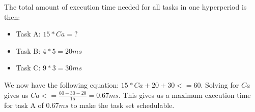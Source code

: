     The total amount of execution time needed for all tasks in one hyperperiod is then:
    \begin{itemize}
        \item Task A: $15*Ca =?$
        \item Task B: $4*5 = 20ms$
        \item Task C: $9*3 = 30ms$
    \end{itemize}

    We now have the following equation: $15*Ca + 20 + 30 <= 60$. Solving for $Ca$ gives us $Ca <= \frac{60-30-20}{15} = 0.67ms$. This gives us a maximum execution time for task A of $0.67ms$ to make the task set schedulable.\\
